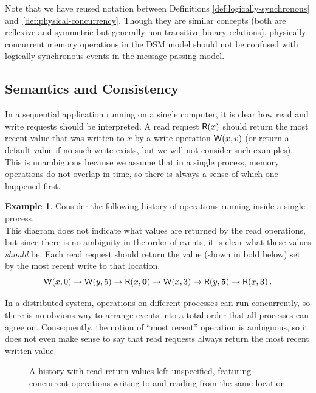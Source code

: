 \documentclass[]             %
{NASA}                       %
\theoremstyle{definition}
\newtheorem{example}[theorem]{Example}
\begin{document}
Note that we have reused notation between Definitions
\ref{def:logically-synchronous} and~\ref{def:physical-concurrency}.
Though they are similar concepts (both are reflexive and symmetric but
generally non-transitive binary relations), physically concurrent
memory operations in the DSM model should not be confused with
logically synchronous events in the message-passing model.

\subsection{Semantics and Consistency}
In a sequential application running on a single computer, it is clear
how read and write requests should be interpreted. A read request
$\mathsf{R}\!\left(x\right)$ should return the most recent value that was written to
$x$ by a write operation $\mathsf{W}\!\left(x, v\right)$ (or return a default value
if no such write exists, but we will not consider such examples). This
is unambiguous because we assume that in a single process, memory
operations do not overlap in time, so there is always a sense of which
one happened first.

\begin{example}
  Consider the following history of operations running inside a single process.
  \[\]
  This diagram does not indicate what values are returned by the read
  operations, but since there is no ambiguity in the order of events,
  it is clear what these values \emph{should} be. Each read request
  should return the value (shown in bold below) set by the most recent
  write to that location.
  \[ \mathsf{W}\!\left(x, 0\right) \to \mathsf{W}\!\left(y, 5\right) \to \mathsf{R}\!\left(x, \textbf{0}\right) \to \mathsf{W}\!\left(x, 3\right) \to \mathsf{R}\!\left(y, \textbf{5}\right) \to \mathsf{R}\!\left(x, \textbf{3}\right). \]
\end{example}

In a distributed system, operations on different processes can run
concurrently, so there is no obvious way to arrange events into a
total order that all processes can agree on. Consequently, the notion
of ``most recent'' operation is ambiguous, so it does not even make
sense to say that read requests always return the most recent written
value.

\begin{figure}[ht]
  
  \caption{A history with read return values left unspecified,
    featuring concurrent operations writing to and reading from the
    same location}
  \label{fig:dsm-example-2}
\end{figure}
\end{document}
